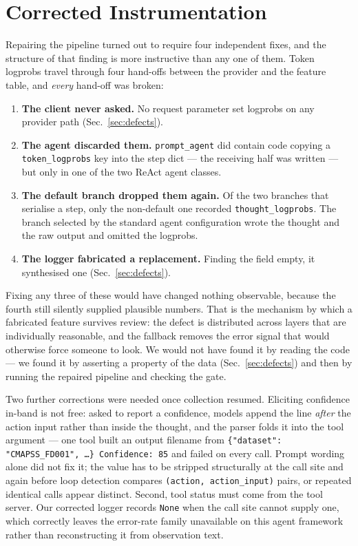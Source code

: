 \documentclass[conference]{IEEEtran}
\begin{document}
\section{Corrected Instrumentation}
\label{sec:fix}

Repairing the pipeline turned out to require four independent fixes, and the
structure of that finding is more instructive than any one of them. Token
logprobs travel through four hand-offs between the provider and the feature
table, and \emph{every} hand-off was broken:

\begin{enumerate}
  \item \textbf{The client never asked.} No request parameter set logprobs on
  any provider path (Sec.~\ref{sec:defects}).
  \item \textbf{The agent discarded them.} \texttt{prompt\_agent} did contain
  code copying a \texttt{token\_logprobs} key into the step dict --- the
  receiving half was written --- but only in one of the two ReAct agent classes.
  \item \textbf{The default branch dropped them again.} Of the two branches that
  serialise a step, only the non-default one recorded
  \texttt{thought\_logprobs}. The branch selected by the standard agent
  configuration wrote the thought and the raw output and omitted the logprobs.
  \item \textbf{The logger fabricated a replacement.} Finding the field empty,
  it synthesised one (Sec.~\ref{sec:defects}).
\end{enumerate}

Fixing any three of these would have changed nothing observable, because the
fourth still silently supplied plausible numbers. That is the mechanism by which
a fabricated feature survives review: the defect is distributed across layers
that are individually reasonable, and the fallback removes the error signal that
would otherwise force someone to look. We would not have found it by reading the
code --- we found it by asserting a property of the data (Sec.~\ref{sec:defects})
and then by running the repaired pipeline and checking the gate.

Two further corrections were needed once collection resumed. Eliciting
confidence in-band is not free: asked to report a confidence, models append the
line \emph{after} the action input rather than inside the thought, and the parser
folds it into the tool argument --- one tool built an output filename from
\texttt{\{"dataset": "CMAPSS\_FD001", \dots\} Confidence: 85} and failed on every
call. Prompt wording alone did not fix it; the value has to be stripped
structurally at the call site and again before loop detection compares
\texttt{(action, action\_input)} pairs, or repeated identical calls appear
distinct. Second, tool status must come from the tool server. Our corrected
logger records \texttt{None} when the call site cannot supply one, which
correctly leaves the error-rate family unavailable on this agent framework rather
than reconstructing it from observation text.
\end{document}
